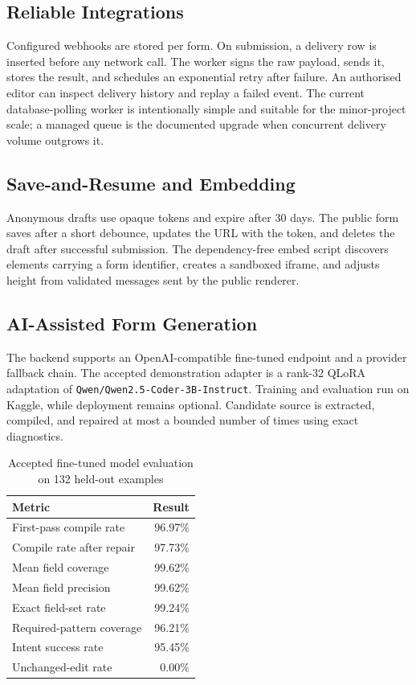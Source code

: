 \documentclass[12pt,a4paper,oneside]{report}
\begin{document}
\subsection{Reliable Integrations}
Configured webhooks are stored per form. On submission, a delivery row is inserted before any
network call. The worker signs the raw payload, sends it, stores the result, and schedules an
exponential retry after failure. An authorised editor can inspect delivery history and replay a
failed event. The current database-polling worker is intentionally simple and suitable for the
minor-project scale; a managed queue is the documented upgrade when concurrent delivery volume
outgrows it.

\subsection{Save-and-Resume and Embedding}
Anonymous drafts use opaque tokens and expire after 30 days. The public form saves after a short
debounce, updates the URL with the token, and deletes the draft after successful submission.
The dependency-free embed script discovers elements carrying a form identifier, creates a
sandboxed iframe, and adjusts height from validated messages sent by the public renderer.

\subsection{AI-Assisted Form Generation}
The backend supports an OpenAI-compatible fine-tuned endpoint and a provider fallback chain.
The accepted demonstration adapter is a rank-32 QLoRA adaptation of
\texttt{Qwen/Qwen2.5-Coder-3B-Instruct}. Training and evaluation run on Kaggle, while deployment
remains optional. Candidate source is extracted, compiled, and repaired at most a bounded number
of times using exact diagnostics.

\begin{table}[H]
\centering
\caption{Accepted fine-tuned model evaluation on 132 held-out examples}
\label{tab:model-results}
\begin{tabular}{lr}
\toprule
Metric & Result\\
\midrule
First-pass compile rate & 96.97\%\\
Compile rate after repair & 97.73\%\\
Mean field coverage & 99.62\%\\
Mean field precision & 99.62\%\\
Exact field-set rate & 99.24\%\\
Required-pattern coverage & 96.21\%\\
Intent success rate & 95.45\%\\
Unchanged-edit rate & 0.00\%\\
\bottomrule
\end{tabular}
\end{table}
\end{document}
